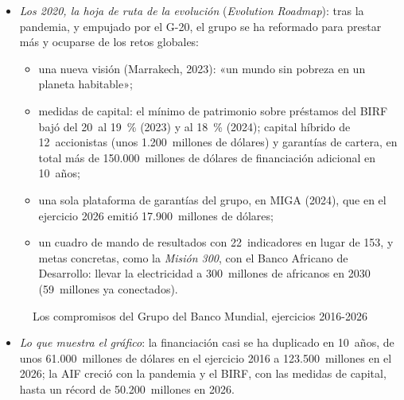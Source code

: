 \documentclass[11pt]{article}
\begin{document}
\begin{itemize}
\begin{itemize}
  \item \emph{Los 2020, la hoja de ruta de la evolución} (\emph{Evolution Roadmap}): tras la pandemia, y empujado por el G-20, el grupo se ha reformado para prestar más y ocuparse de los retos globales:
    \begin{itemize}
    \item una nueva visión (Marrakech, 2023): «un mundo sin pobreza en un planeta habitable»\nocite{CD2023Marrakech};
    \item medidas de capital: el mínimo de patrimonio sobre préstamos del BIRF bajó del 20~al 19~\% (2023) y al 18~\% (2024); capital híbrido de 12~accionistas (unos 1.200~millones de dólares) y garantías de cartera, en total más de 150.000~millones de dólares de financiación adicional en 10~años\nocite{BM2024Evolucion,BM2026InformeAnual};
    \item una sola plataforma de garantías del grupo, en MIGA (2024), que en el ejercicio 2026 emitió 17.900~millones de dólares\nocite{BM2026InformeAnual};
    \item un cuadro de mando de resultados con 22~indicadores en lugar de 153, y metas concretas, como la \emph{Misión 300}, con el Banco Africano de Desarrollo: llevar la electricidad a 300~millones de africanos en 2030 (59~millones ya conectados)\nocite{BM2026InformeAnual}.
    \end{itemize}
  \end{itemize}
\end{itemize}

\begin{figure}[H]
\centering
\caption{Los compromisos del Grupo del Banco Mundial, ejercicios 2016-2026}\label{fig:compromisos-gbm}
\end{figure}

\begin{itemize}
\item \emph{Lo que muestra el gráfico}: la financiación casi se ha duplicado en 10~años, de unos 61.000~millones de dólares en el ejercicio 2016 a 123.500~millones en el 2026; la AIF creció con la pandemia y el BIRF, con las medidas de capital, hasta un récord de 50.200~millones en 2026\nocite{BM2026InformeAnual}.
\end{itemize}
\end{document}
